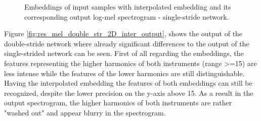 \begin{figure}[htb!]
    \centering
    \captionsetup{justification=centering}
    \caption{Embeddings of input samples with interpolated embedding and its corresponding output log-mel spectrogram - single-stride network.}
    \label{fig:res_mel_single_str_2D_inter_output}
\end{figure}

Figure \ref{fig:res_mel_double_str_2D_inter_output}, shows the output of the double-stride network where already significant differences to the output of the single-strided network can be seen. First of all regarding the embeddings, the features representing the higher harmonics of both instruments (range >=15) are less intense while the features of the lower harmonics are still distinguishable. Having the interpolated embedding the features of both embeddings can still be recognized, despite the lower precision on the y-axis above 15. As a result in the output spectrogram, the higher harmonics of both instruments are rather "washed out" and appear blurry in the spectrogram. 

